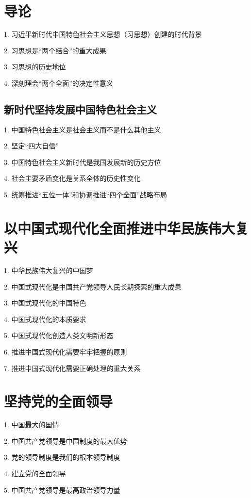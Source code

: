{}
\section*{导论}%
\label{sec*:导论}
1. 习近平新时代中国特色社会主义思想（习思想）创建的时代背景

2. 习思想是“两个结合”的重大成果

3. 习思想的历史地位

4. 深刻理会“两个全面”的决定性意义
\subsection*{新时代坚持发展中国特色社会主义}%
\label{sub*:新时代坚持发展中国特色社会主义}
1. 中国特色社会主义是社会主义而不是什么其他主义

2. 坚定“四大自信”

3. 中国特色社会主义新时代是我国发展新的历史方位

4. 社会主要矛盾变化是关系全体的历史性变化

5. 统筹推进“五位一体”和协调推进“四个全面”战略布局
\section*{以中国式现代化全面推进中华民族伟大复兴}%
\label{sec*:以中国式现代化全面推进中华民族伟大复兴}
1. 中华民族伟大复兴的中国梦

2. 中国式现代化是中国共产党领导人民长期探索的重大成果

3. 中国式现代化的中国特色

4. 中国式现代化的本质要求

5. 中国式现代化创造人类文明新形态

6. 推进中国式现代化需要牢牢把握的原则

7. 推进中国式现代化需要正确处理的重大关系
\section*{坚持党的全面领导}%
\label{sec*:坚持党的全面领导}
1. 中国最大的国情

2. 中国共产党领导是中国制度的最大优势

3. 党的领导制度是我们的根本领导制度

4. 建立党的全面领导

5. 中国共产党领导是最高政治领导力量

